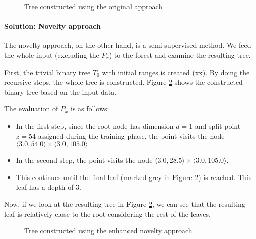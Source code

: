 \begin{figure}[htbp]
\centering

\caption{Tree constructed using the original approach}
\label{fig:example_noutlier_tree_color}
\end{figure}



\paragraph{Solution: Novelty approach}

The novelty approach, on the other hand, is a semi-supervised method. We feed the whole input (excluding the $P_x$) to the forest and examine the resulting tree.

First, the trivial binary tree $T_0$ with initial ranges is created (xx).
By doing the recursive steps, the whole tree is constructed.
Figure \ref{fig:example_novelty_tree_color} shows the constructed binary tree based on the input data.

The evaluation of $P_x$ is as follows:
\begin{itemize}
    \item In the first step, since the root node has dimension $d=1$ and split point $z = 54$ assigned during the training phase, the point visits the node $\langle 3.0, 54.0\rangle \times \langle 3.0, 105.0\rangle$
    \item In the second step, the point visits the node $\langle 3.0, 28.5\rangle \times \langle 3.0, 105.0\rangle$.
    \item This continues until the final leaf (marked grey in Figure \ref{fig:example_novelty_tree_color}) is reached. This leaf has a depth of 3.
    
\end{itemize}


Now, if we look at the resulting tree in Figure \ref{fig:example_novelty_tree_color}, we can see that the resulting leaf is relatively close to the root considering the rest of the leaves.


\begin{figure}[htbp]
\centering

\caption{Tree constructed using the enhanced novelty approach}
\label{fig:example_novelty_tree_color}
\end{figure}
